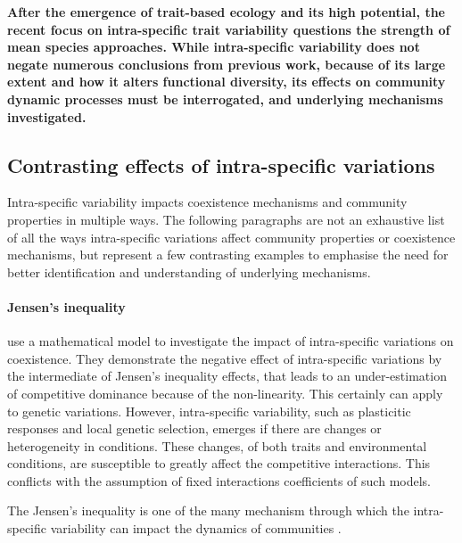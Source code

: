 \textbf{After the emergence of trait-based ecology and its high potential, the recent focus on intra-specific trait variability questions the strength of mean species approaches. While  intra-specific variability  does not negate numerous conclusions from previous work, because of its large extent and how it alters functional diversity, its effects on community dynamic processes must be interrogated, and underlying mechanisms investigated.}

\subsection{Contrasting effects of intra-specific variations}

Intra-specific variability impacts coexistence mechanisms and community properties in multiple ways. The following paragraphs are not an exhaustive list of all the ways intra-specific variations affect community properties or coexistence mechanisms, but represent a few contrasting examples to emphasise the need for better identification and understanding of underlying mechanisms. 

\paragraph{Jensen's inequality}

\citet{hart_how_2016} use a mathematical model to investigate the impact of intra-specific variations on coexistence.  They demonstrate the negative effect of intra-specific variations by the intermediate of Jensen's inequality effects, that leads to an under-estimation of competitive dominance because of the non-linearity. This certainly can apply to genetic variations. However, intra-specific variability, such as plasticitic responses and local genetic selection, emerges if there are changes or heterogeneity in conditions. These changes, of both traits and environmental conditions, are susceptible to greatly affect the competitive interactions. This conflicts with the assumption of fixed interactions coefficients of such models.

The Jensen's inequality is one of the many mechanism through which the intra-specific variability can impact the dynamics of communities \parencite{bolnick_why_2011}.



